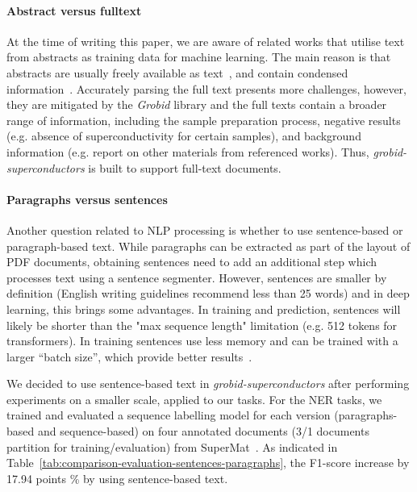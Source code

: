 \documentclass[]{interact}
\theoremstyle{plain}%
\theoremstyle{definition}
\theoremstyle{remark}
\begin{document}
\paragraph*{Abstract versus fulltext}
At the time of writing this paper, we are aware of related works that utilise text from abstracts as training data for machine learning. 
The main reason is that abstracts are usually freely available as text~\cite{kononova_text-mined_2019}, and contain condensed information~\cite{yamaguchi-etal-2020-sc, court_magnetic_2020}. 
Accurately parsing the full text presents more challenges, however, they are mitigated by the \textit{Grobid} library and the full texts contain a broader range of information, including the sample preparation process, negative results (e.g. absence of superconductivity for certain samples), and background information (e.g. report on other materials from referenced works). 
Thus, \textit{grobid-superconductors} is built to support full-text documents. 

\paragraph*{Paragraphs versus sentences}
Another question related to NLP processing is whether to use sentence-based or paragraph-based text. 
While paragraphs can be extracted as part of the layout of PDF documents, obtaining sentences need to add an additional step which processes text using a sentence segmenter.
However, sentences are smaller by definition (English writing guidelines recommend less than 25 words) and in deep learning, this brings some advantages. 
In training and prediction, sentences will likely be shorter than the "max sequence length" limitation (e.g. 512 tokens for transformers). 
In training sentences use less memory and can be trained with a larger ``batch size'', which provide better results~\cite{roberta}.

We decided to use sentence-based text in \textit{grobid-superconductors} after performing experiments on a smaller scale, applied to our tasks. 
For the NER tasks, we trained and evaluated a sequence labelling model for each version (paragraphs-based and sequence-based) on four annotated documents (3/1 documents partition for training/evaluation) from SuperMat~\cite{foppiano2021supermat}.
As indicated in Table~\ref{tab:comparison-evaluation-sentences-paragraphs}, the F1-score increase by 17.94 points \% by using sentence-based text.
\end{document}
